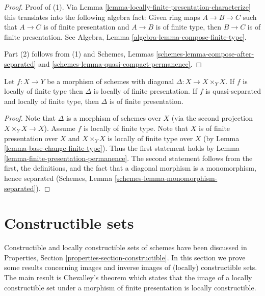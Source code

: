 \begin{proof}
Proof of (1). Via Lemma \ref{lemma-locally-finite-presentation-characterize}
this translates into the following algebra
fact: Given ring maps $A \to B \to C$ such that $A \to C$ is
of finite presentation and $A \to B$ is of finite type,
then $B \to C$ is of finite presentation. See
Algebra, Lemma \ref{algebra-lemma-compose-finite-type}.

\medskip\noindent
Part (2) follows from (1) and
Schemes, Lemmas \ref{schemes-lemma-compose-after-separated} and
\ref{schemes-lemma-quasi-compact-permanence}.
\end{proof}

\begin{lemma}
\label{lemma-diagonal-morphism-finite-type}
Let $f : X \to Y$ be a morphism of schemes with diagonal
$\Delta : X \to X \times_Y X$. If $f$ is locally of finite type
then $\Delta$ is locally of finite presentation. If $f$ is quasi-separated
and locally of finite type, then $\Delta$ is of finite presentation.
\end{lemma}

\begin{proof}
Note that $\Delta$ is a morphism of schemes over $X$ (via the second
projection $X \times_Y X \to X$). Assume $f$ is locally of finite type.
Note that $X$ is of finite presentation over $X$ and $X \times_Y X$ is
locally of finite type over $X$ (by Lemma \ref{lemma-base-change-finite-type}).
Thus the first statement holds by
Lemma \ref{lemma-finite-presentation-permanence}.
The second statement follows from the first, the definitions, and
the fact that a diagonal morphism is a monomorphism, hence separated
(Schemes, Lemma \ref{schemes-lemma-monomorphism-separated}).
\end{proof}








\section{Constructible sets}
\label{section-constructible}

\noindent
Constructible and locally constructible sets of schemes have been discussed in
Properties, Section \ref{properties-section-constructible}.
In this section we prove some results concerning images and inverse images
of (locally) constructible sets. The main result is Chevalley's theorem
which states that the image of a locally constructible set under a morphism
of finite presentation is locally constructible.

